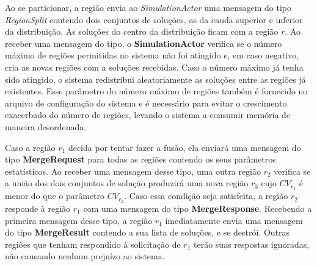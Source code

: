 Ao se particionar, a região envia ao \textit{SimulationActor} uma mensagem do tipo \textit{RegionSplit} contendo dois conjuntos de soluções, as da cauda superior e inferior da distribuição. As soluções do centro da distribuição ficam com a região $r$. Ao receber uma mensagem do tipo, o \textbf{SimulationActor} verifica se o número máximo de regiões permitidas no sistema não foi atingido e, em caso negativo, cria as novas regiões com a soluções recebidas. Caso o número máximo já tenha sido atingido, o sistema redistribui aleatoriamente as soluções entre as regiões já existentes. Esse parâmetro do número máximo de regiões também é fornecido no arquivo de configuração do sistema e é necessário para evitar o crescimento exacerbado do número de regiões, levando o sistema a consumir memória de maneira desordenada. 

Caso a região $r_1$ decida por tentar fazer a fusão, ela enviará uma mensagem do tipo \textbf{MergeRequest} para todas as regiões contendo os seus parâmetros estatísticos. Ao receber uma mensagem desse tipo, uma outra região $r_2$ verifica se a união dos dois conjuntos de solução produzirá uma nova região $r_3$ cujo $CV_{r_3}$ é menor do que o parâmetro $CV_{r_2}$. Caso essa condição seja satisfeita, a região $r_2$ responde à região $r_1$ com uma mensagem do tipo \textbf{MergeResponse}. Recebendo a primeira mensagem desse tipo, a região $r_1$ imediatamente envia uma mensagem do tipo \textbf{MergeResult} contendo a sua lista de soluções, e se destrói. Outras regiões que tenham respondido à solicitação de $r_1$ terão suas respostas ignoradas, não causando nenhum prejuízo ao sistema.

